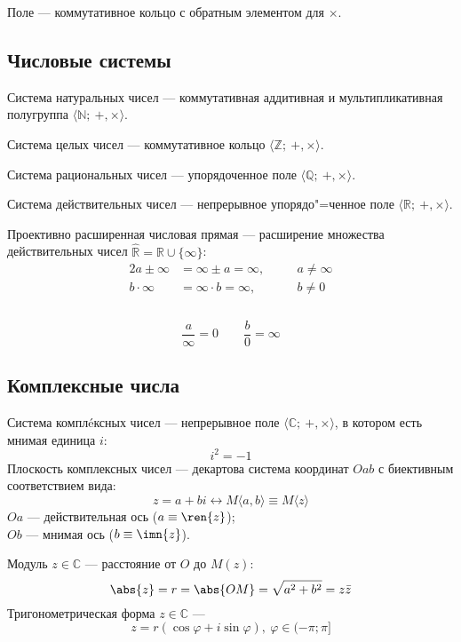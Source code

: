 {\ital Поле} --- коммутативное кольцо с обратным элементом для $\times$.

\subsection{Числовые системы}

{\ital Система натуральных чисел} --- коммутативная аддитивная и мультипликативная полугруппа $\langle\mathbb{N};\ +,\times\rangle$.\par

{\ital Система целых чисел} --- коммутативное кольцо $\langle\mathbb{Z};\ +,\times\rangle$.
\par

{\ital Система рациональных чисел} --- упорядоченное поле $\langle\mathbb{Q};\ +,\times
\rangle$.\par

{\ital Система действительных чисел} --- непрерывное упорядо"=ченное поле $\langle\mathbb
{R};\ +,\times\rangle$.

{\ital Проективно расширенная числовая прямая} --- расширение множества действительных 
чисел $\widehat{\mathbb{R}}=\mathbb{R}\cup\{\infty\}$:
\begin{alignat*}{2}
a\pm\infty&=\infty\pm a=\infty,\quad &&a\neq\infty\\
b\cdot\infty&=\infty\cdot b=\infty, &&b\neq 0\\
\end{alignat*}\\[-26pt]
$$\frac{a}{\infty}=0\quad\quad\frac{b}{0}=\infty$$

\newpage
\subsection{Комплексные числа}

{\bold Система комплéксных чисел} --- непрерывное поле $\langle\mathbb{C};\ +,
\times\rangle$, в котором есть {\ital мнимая единица} $i$:
$$i^2=-1$$
{\bold Плоскость комплексных чисел} --- декартова система координат $Oab$ с биективным соответствием вида:
$$z=a+bi\leftrightarrow M\langle a,b\rangle\equiv M\langle z\rangle$$
$Oa$ --- действительная ось {\ital\color{desc}($a\equiv\ren{z}$)};\\
$Ob$ --- мнимая ось {\ital\color{desc}($b\equiv\imn{z}$)}.

{\ital Модуль} $z\in\mathbb{C}$ --- расстояние от $O$ до $M(z)$:
$$\abs{z}=r=\abs{OM}=\sqrt{a^2+b^2}=z\bar{z}$$
Тригонометрическая форма $z\in\mathbb{C}$ ---
$$z=r(\cos\varphi+i\sin\varphi),\ \varphi\in(-\pi;\pi]$$\\


